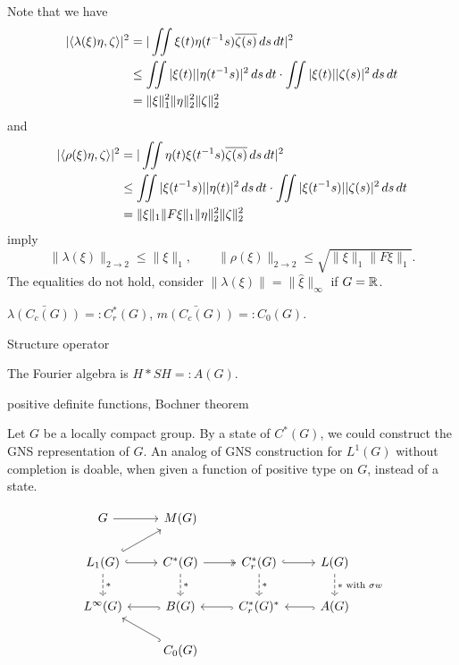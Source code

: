 \documentclass{../../large}
\begin{document}
Note that we have
\begin{align*}
|\langle\lambda(\xi)\eta,\zeta\rangle|^2
&=|\iint\xi(t)\eta(t^{-1}s)\overline{\zeta(s)}\,ds\,dt|^2\\
&\le\iint|\xi(t)||\eta(t^{-1}s)|^2\,ds\,dt\cdot\iint|\xi(t)||\zeta(s)|^2\,ds\,dt\\
&=\|\xi\|_1^2\|\eta\|_2^2\|\zeta\|_2^2
\end{align*}
and
\begin{align*}
|\langle\rho(\xi)\eta,\zeta\rangle|^2
&=|\iint\eta(t)\xi(t^{-1}s)\overline{\zeta(s)}\,ds\,dt|^2\\
&\le\iint|\xi(t^{-1}s)||\eta(t)|^2\,ds\,dt\cdot\iint|\xi(t^{-1}s)||\zeta(s)|^2\,ds\,dt\\
&=\|\xi\|_1\|F\xi\|_1\|\eta\|_2^2\|\zeta\|_2^2
\end{align*}
imply
\[\|\lambda(\xi)\|_{2\to2}\le\|\xi\|_1,\qquad\|\rho(\xi)\|_{2\to2}\le\sqrt{\|\xi\|_1\|F\xi\|_1}.\]
The equalities do not hold, consider $\|\lambda(\xi)\|=\|\hat\xi\|_\infty$ if $G=\mathbb{R}$.




\begin{prb}
$\bar{\lambda(C_c(G))}=:C^*_r(G)$, $\bar{m(C_c(G))}=:C_0(G)$.
\end{prb}
\begin{prb}
Structure operator
\end{prb}

\begin{prb}
The Fourier algebra is $H*SH=:A(G)$.
\end{prb}
\begin{prb}
positive definite functions, Bochner theorem
\end{prb}
\begin{prb}
Let $G$ be a locally compact group.
By a state of $C^*(G)$, we could construct the GNS representation of $G$.
An analog of GNS construction for $L^1(G)$ without completion is doable, when given a function of positive type on $G$, instead of a state.
\end{prb}


\[\begin{tikzcd}
G \ar{r} & M(G) & \, & \,\\
L_1(G) \ar[hook]{ur}\ar[hook]{r}\ar[dashed]{d}{*} & C^*(G) \ar[two heads]{r}\ar[dashed]{d}{*} & C_r^*(G) \ar[hook]{r}\ar[dashed]{d}{*} & L(G) \ar[dashed]{d}{*\text{ with }\sigma w}\\
L^\infty(G) & B(G) \ar[hook]{l} & C_r^*(G)^* \ar[hook]{l} & A(G) \ar[hook]{l}\\
& C_0(G) \ar[hook]{ul} & &
\end{tikzcd}\]
\end{document}

